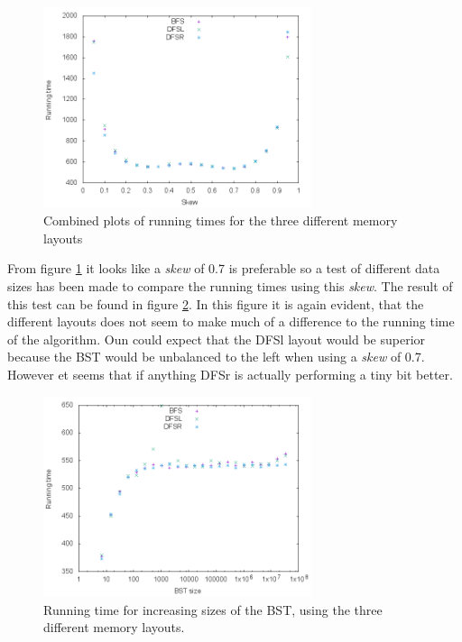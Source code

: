 \documentclass{article}
\begin{document}
\begin{figure}[H]
	\centering
	\includegraphics[width=0.7\textwidth]{figures/combined_running_time}
	\caption{Combined plots of running times for the three different memory layouts}
	\label{fig:combined_running_time}
\end{figure}

From figure \ref{fig:combined_running_time} it looks like a \textit{skew} of 0.7 is preferable so a test of different data sizes has been made to compare the running times using this \textit{skew}. The result of this test can be found in figure \ref{fig:combined_running_time_07}. In this figure it is again evident, that the different layouts does not seem to make much of a difference to the running time of the algorithm. Oun could expect that the DFSl layout would be superior because the BST would be unbalanced to the left when using a \textit{skew} of 0.7. However et seems that if anything DFSr is actually performing a tiny bit better.

\begin{figure}[H]
	\centering
	\includegraphics[width=0.7\textwidth]{figures/combined_running_time_07}
	\caption{Running time for increasing sizes of the BST, using the three different memory layouts.}
	\label{fig:combined_running_time_07}
\end{figure}
\end{document}
